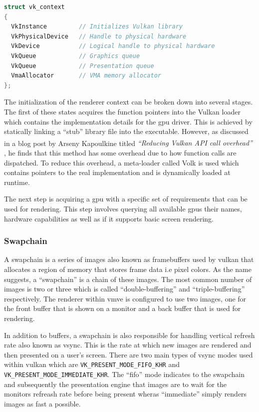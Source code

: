 \documentclass[11pt]{article}
\begin{document}
\begin{lstlisting}[language=C++]
struct vk_context
{
  VkInstance         // Initializes Vulkan library
  VkPhysicalDevice   // Handle to physical hardware
  VkDevice           // Logical handle to physical hardware
  VkQueue            // Graphics queue
  VkQueue            // Presentation queue
  VmaAllocator       // VMA memory allocator
};
\end{lstlisting}

The initialization of the renderer context can be broken down into several
stages. The first of these states acquires the function pointers into the Vulkan
loader which contains the implementation details for the \gls*{gpu} driver. This
is achieved by statically linking a ``stub'' library file into the executable.
However, as discussed in a blog post by Arseny Kapoulkine titled
\textit{``Reducing Vulkan\textsuperscript{\textregistered} API call overhead''}
\cite{volk}, he finds that this method has some overhead due to how function
calls are dispatched. To reduce this overhead, a meta-loader called Volk is used
which contains pointers to the real implementation and is dynamically loaded at
runtime.

The next step is acquiring a \gls*{gpu} with a specific set of requirements that
can be used for rendering. This step involves querying all available \glspl*{gpu}
their names, hardware capabilities as well as if it supports basic screen
rendering.

\subsubsection{Swapchain}
A swapchain is a series of images also known as framebuffers used by
\gls*{vulkan} that allocates a region of memory that stores frame data i.e pixel
colors. As the name suggests, a ``swapchain'' is a chain of these images. The
most common number of images is two or three which is called
``double-buffering'' and ``triple-buffering'' respectively. The renderer within
\gls*{vmve} is configured to use two images, one for the front buffer that is shown
on a monitor and a back buffer that is used for rendering.

In addition to buffers, a swapchain is also responsible for handling vertical
refresh rate also known as vsync. This is the rate at which new images are
rendered and then presented on a user's screen. There are two main types of
vsync modes used within \gls*{vulkan} which are
\lstinline{VK_PRESENT_MODE_FIFO_KHR} and
\lstinline{VK_PRESENT_MODE_IMMEDIATE_KHR}. The ``fifo'' mode indicates to the 
swapchain and subsequently the presentation engine that images are to wait 
for the monitors refreash rate before being present wheras ``immediate'' simply
renders images as fast a possible.
\end{document}
